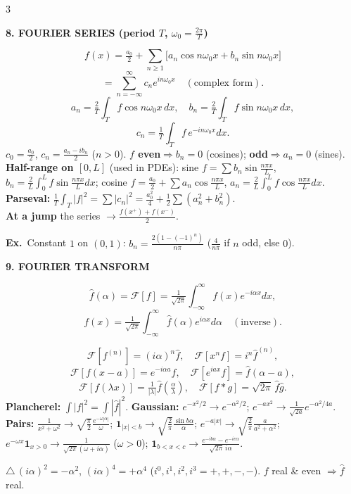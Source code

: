 \documentclass[a4paper,8pt]{extarticle}
\newcommand{\topic}[2]{%
  \vspace{4.5pt}%
  {\colorbox{#1}{\parbox{\dimexpr\columnwidth-2\fboxsep}{\color{white}\bfseries\footnotesize #2}}}\par\vspace{2.5pt}}
\newcommand{\subt}[1]{\smallskip{\bfseries\itshape #1}\par}
\newcommand{\warn}{\textcolor{cWarn}{\textbf{\textwarning\,}}}
\newcommand{\textwarning}{$\triangle$}
\newcommand{\exo}{\textbf{\textcolor{cA}{Ex.}}\ }
\newcommand{\Fou}{\mathcal{F}}
\newcommand{\To}{\!\to\!}
\begin{document}
\begin{multicols}{3}
\topic{cC}{8. FOURIER SERIES (period $T$, $\omega_0{=}\tfrac{2\pi}T$)}
\[ f(x){=}\tfrac{a_0}2{+}\!\sum_{n\ge1}\!\big[a_n\cos n\omega_0 x{+}b_n\sin n\omega_0 x\big]\]
\[ {=}\sum_{n=-\infty}^{\infty}c_n e^{in\omega_0 x}\quad(\text{complex form}).\]
\[ a_n{=}\tfrac2T\!\int_T\! f\cos n\omega_0x\,dx,\quad b_n{=}\tfrac2T\!\int_T\! f\sin n\omega_0x\,dx,\]
\[ c_n{=}\tfrac1T\!\int_T\! f\, e^{-in\omega_0x}dx.\]
$c_0{=}\frac{a_0}2$, $c_n{=}\frac{a_n-ib_n}2$ ($n{>}0$). \textbf{$f$ even}$\Rightarrow b_n{=}0$ (cosines); \textbf{odd}$\Rightarrow a_n{=}0$ (sines).\\
\textbf{Half-range on $[0,L]$} (used in PDEs): sine $f{=}\sum b_n\sin\frac{n\pi x}L$, $b_n{=}\frac2L\int_0^L f\sin\frac{n\pi x}L dx$; cosine $f{=}\frac{a_0}2{+}\sum a_n\cos\frac{n\pi x}L$, $a_n{=}\frac2L\int_0^L f\cos\frac{n\pi x}L dx$.\\
\textbf{Parseval:} $\frac1T\int_T|f|^2{=}\sum|c_n|^2{=}\frac{a_0^2}4{+}\frac12\sum(a_n^2{+}b_n^2)$.\\
\textbf{At a jump} the series $\to\frac{f(x^+)+f(x^-)}2$.
\begin{ex}\exo Constant $1$ on $(0,1)$: $b_n{=}\frac{2(1-(-1)^n)}{n\pi}$ ($\frac4{n\pi}$ if $n$ odd, else $0$).\end{ex}

\topic{cC}{9. FOURIER TRANSFORM}
\[ \hat f(\alpha){=}\Fou[f]{=}\tfrac1{\sqrt{2\pi}}\!\int_{-\infty}^{\infty}\! f(x)e^{-i\alpha x}dx,\]
\[ f(x){=}\tfrac1{\sqrt{2\pi}}\!\int_{-\infty}^{\infty}\!\hat f(\alpha)e^{i\alpha x}d\alpha\quad(\text{inverse}).\]
\subt{Properties:}
\[ \Fou[f^{(n)}]{=}(i\alpha)^n\hat f,\quad \Fou[x^nf]{=}i^n\hat f^{(n)},\]
\[ \Fou[f(x{-}a)]{=}e^{-i\alpha a}\hat f,\quad \Fou[e^{iax}f]{=}\hat f(\alpha{-}a),\]
\[ \Fou[f(\lambda x)]{=}\tfrac1{|\lambda|}\hat f(\tfrac\alpha\lambda),\quad \Fou[f{*}g]{=}\sqrt{2\pi}\,\hat f\hat g.\]
\textbf{Plancherel:} $\int|f|^2{=}\int|\hat f|^2$. \;\textbf{Gaussian:} $e^{-x^2/2}{\To}e^{-\alpha^2/2}$; $e^{-ax^2}{\To}\frac1{\sqrt{2a}}e^{-\alpha^2/4a}$.\\
\textbf{Pairs:} $\frac1{x^2+\omega^2}{\To}\sqrt{\frac\pi2}\frac{e^{-\omega|\alpha|}}\omega$; \;$\mathbf 1_{|x|<b}{\To}\sqrt{\frac2\pi}\frac{\sin b\alpha}\alpha$; \;$e^{-a|x|}{\To}\sqrt{\frac2\pi}\frac a{a^2+\alpha^2}$; \;$e^{-\omega x}\mathbf 1_{x>0}{\To}\frac1{\sqrt{2\pi}(\omega+i\alpha)}$ ($\omega{>}0$); \;$\mathbf 1_{b<x<c}{\To}\frac{e^{-ib\alpha}-e^{-ic\alpha}}{\sqrt{2\pi}\,i\alpha}$.
\begin{tip}\warn $(i\alpha)^2{=}{-}\alpha^2$, $(i\alpha)^4{=}{+}\alpha^4$ ($i^0{,}i^1{,}i^2{,}i^3{=}{+}{,}{+}{,}{-}{,}{-}$). $f$ real \& even $\Rightarrow\hat f$ real.\end{tip}


\end{multicols}
\end{document}
